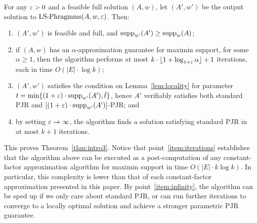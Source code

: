 \begin{theorem}\label{thm:enabler}
For any $\varepsilon>0$ and a feasible full solution $(A,w)$, let $(A',w')$ be the output solution to $\operatorname{LS-Phragmms}(A,w,\varepsilon)$. Then: 
\begin{enumerate}
    \item $(A',w')$ is feasible and full, and $\operatorname{supp}_{w'}(A')\geq \operatorname{supp}_w(A)$; \label{item:support}
		\item if $(A,w)$ has an $\alpha$-approximation guarantee for maximin support, for some $\alpha\geq 1$, then the algorithm performs at most $k\cdot \lfloor 1+\log_{1+\varepsilon} \alpha\rfloor +1$ iterations, each in time $O(|E|\cdot \log k)$; \label{item:iterations}
		\item $(A', w')$ satisfies the condition on Lemma~\ref{lem:locality} for parameter $t=\min\{(1+\varepsilon)\cdot \operatorname{supp}_{w'}(A'), \hat{t}\}$, hence $A'$ verifiably satisfies both standard PJR and $[(1+\varepsilon)\cdot \operatorname{supp}_{w'}(A')]$-PJR; and
		\label{item:tPJR}
		\item by setting $\varepsilon\rightarrow\infty$, the algorithm finds a solution satisfying standard PJR in at most $k+1$ iterations. \label{item:infinity}

\end{enumerate}
\end{theorem}

This proves Theorem~\ref{thm:intro3}. 
Notice that point~\ref{item:iterations} establishes that the algorithm above can be executed as a post-computation of any constant-factor approximation algorithm for maximin support in time $O(|E|\cdot k\log k)$. In particular, this complexity is lower than that of each constant-factor approximation presented in this paper.
By point~\ref{item:infinity}, the algorithm can be sped up if we only care about standard PJR, or can run further iterations to converge to a locally optimal solution and achieve a stronger parametric PJR guarantee. 


